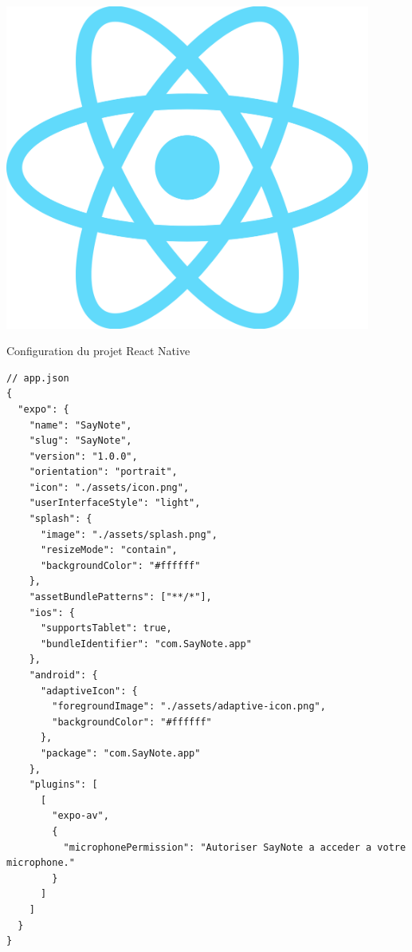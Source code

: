 \begin{minipage}{0.25\textwidth}
\centering
\includegraphics[width=0.9\textwidth]{assets/docs/logo_reactnative.png}
\end{minipage}

\begin{codebox}{Configuration du projet React Native}
\begin{lstlisting}
// app.json
{
  "expo": {
    "name": "SayNote",
    "slug": "SayNote",
    "version": "1.0.0",
    "orientation": "portrait",
    "icon": "./assets/icon.png",
    "userInterfaceStyle": "light",
    "splash": {
      "image": "./assets/splash.png",
      "resizeMode": "contain",
      "backgroundColor": "#ffffff"
    },
    "assetBundlePatterns": ["**/*"],
    "ios": {
      "supportsTablet": true,
      "bundleIdentifier": "com.SayNote.app"
    },
    "android": {
      "adaptiveIcon": {
        "foregroundImage": "./assets/adaptive-icon.png",
        "backgroundColor": "#ffffff"
      },
      "package": "com.SayNote.app"
    },
    "plugins": [
      [
        "expo-av",
        {
          "microphonePermission": "Autoriser SayNote a acceder a votre microphone."
        }
      ]
    ]
  }
}
\end{lstlisting}
\end{codebox}

